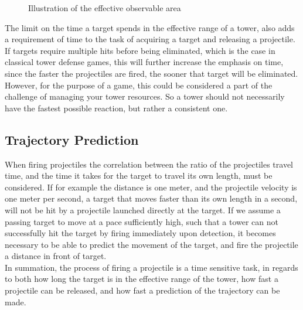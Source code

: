 \begin{figure}[H]
\begin{center}
\end{center}
\caption{Illustration of the effective observable area}
\label{25}
\end{figure}
\smallskip

The limit on the time a target spends in the effective range of a tower, also adds a requirement of time to the task of acquiring a target and releasing a projectile. If targets require multiple hits before being eliminated, which is the case in classical tower defense games, this will further increase the emphasis on time, since the faster the projectiles are fired, the sooner that target will be eliminated. However, for the purpose of a game, this could be considered a part of the challenge of managing your tower resources. So a tower should not necessarily have the fastest possible reaction, but rather a consistent one. 

\subsection{Trajectory Prediction}\label{sec:motionprediction}
When firing projectiles the correlation between the ratio of the projectiles travel time, and the time it takes for the target to travel its own length, must be considered. If for example the distance is one meter, and the projectile velocity is one meter per second, a target that moves faster than its own length in a second, will not be hit by a projectile launched directly at the target. If we assume a passing target to move at a pace sufficiently high, such that a tower can not successfully hit the target by firing immediately upon detection, it becomes necessary to be able to predict the movement of the target, and fire the projectile a distance in front of target.\\

In summation, the process of firing a projectile is a time sensitive task, in regards to both how long the target is in the effective range of the tower, how fast a projectile can be released, and how fast a prediction of the trajectory can be made.
\bigskip





